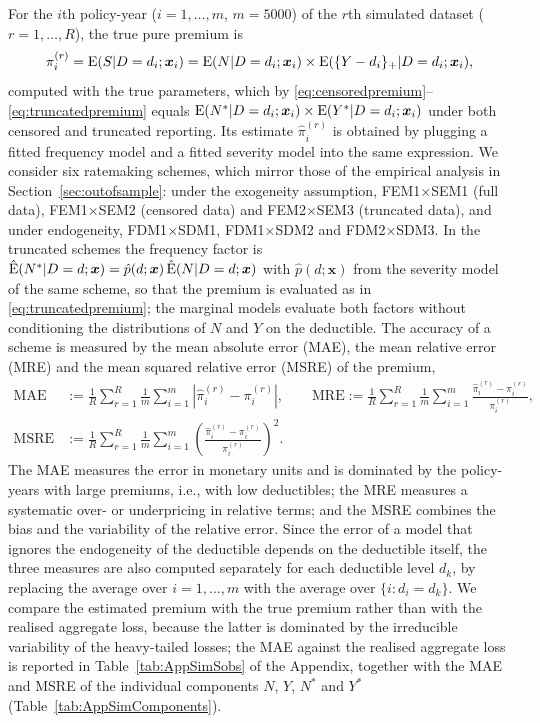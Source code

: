 \documentclass[11pt]{article}
\newcommand{\rev}[1]{{\color{blue}#1}}
\begin{document}
\rev{For the $i$th policy-year ($i=1,\ldots,m$, $m=5000$) of the $r$th simulated dataset ($r=1,\ldots,R$), the true pure premium is
$$
\pi^{(r)}_i={\rm E}(S|D=d_i;\bm{x}_i)={\rm E}(N|D=d_i;\bm{x}_i)\times{\rm E}(\{Y-d_i\}_+|D=d_i;\bm{x}_i),
$$
computed with the true parameters, which by \eqref{eq:censoredpremium}--\eqref{eq:truncatedpremium} equals ${\rm E}(N^*|D=d_i;\bm{x}_i)\times{\rm E}(Y^*|D=d_i;\bm{x}_i)$ under both censored and truncated reporting. Its estimate $\hat\pi^{(r)}_i$ is obtained by plugging a fitted frequency model and a fitted severity model into the same expression. We consider six ratemaking schemes, which mirror those of the empirical analysis in Section~\ref{sec:outofsample}: under the exogeneity assumption, FEM1$\times$SEM1 (full data), FEM1$\times$SEM2 (censored data) and FEM2$\times$SEM3 (truncated data), and under endogeneity, FDM1$\times$SDM1, FDM1$\times$SDM2 and FDM2$\times$SDM3. In the truncated schemes the frequency factor is $\hat{\rm E}(N^*|D=d;\bm{x})=\hat p(d;\bm{x})\,\hat{\rm E}(N|D=d;\bm{x})$ with $\hat p(d;\bm{x})$ from the severity model of the same scheme, so that the premium is evaluated as in \eqref{eq:truncatedpremium}; the marginal models evaluate both factors without conditioning the distributions of $N$ and $Y$ on the deductible. The accuracy of a scheme is measured by the mean absolute error (MAE), the mean relative error (MRE) and the mean squared relative error (MSRE) of the premium,
\begin{align*}
\text{MAE}&:=\frac{1}{R}\sum_{r=1}^{R}\frac{1}{m}\sum_{i=1}^{m}\left|\hat\pi^{(r)}_i-\pi^{(r)}_i\right|,\qquad
\text{MRE}:=\frac{1}{R}\sum_{r=1}^{R}\frac{1}{m}\sum_{i=1}^{m}\frac{\hat\pi^{(r)}_i-\pi^{(r)}_i}{\pi^{(r)}_i},\\
\text{MSRE}&:=\frac{1}{R}\sum_{r=1}^{R}\frac{1}{m}\sum_{i=1}^{m}\left(\frac{\hat\pi^{(r)}_i-\pi^{(r)}_i}{\pi^{(r)}_i}\right)^2.
\end{align*}
The MAE measures the error in monetary units and is dominated by the policy-years with large premiums, i.e., with low deductibles; the MRE measures a systematic over- or underpricing in relative terms; and the MSRE combines the bias and the variability of the relative error. Since the error of a model that ignores the endogeneity of the deductible depends on the deductible itself, the three measures are also computed separately for each deductible level $d_k$, by replacing the average over $i=1,\ldots,m$ with the average over $\{i:d_i=d_k\}$. We compare the estimated premium with the true premium rather than with the realised aggregate loss, because the latter is dominated by the irreducible variability of the heavy-tailed losses; the MAE against the realised aggregate loss is reported in Table~\ref{tab:AppSimSobs} of the Appendix, together with the MAE and MSRE of the individual components $N$, $Y$, $N^*$ and $Y^*$ (Table~\ref{tab:AppSimComponents}).}
\end{document}
